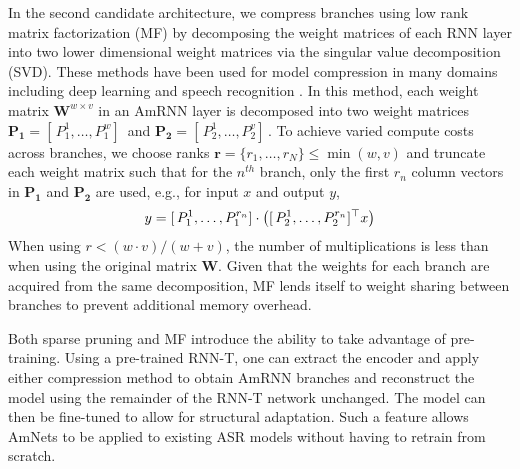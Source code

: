\documentclass[a4paper]{article}
\newcommand{\matdimx}{w}
\newcommand{\matdimy}{v}
\begin{document}
In the second candidate architecture, we compress branches using low rank matrix factorization (MF) by decomposing the weight matrices of each RNN layer into two lower dimensional weight matrices via the singular value decomposition (SVD). These methods have been used for model compression in many domains \cite{Andrews1976,Aharon2006,Rufai2014,McGivney2014} including deep learning and speech recognition \cite{Prabhavalkar2016,Kim2019,Swaminathan2020}. In this method, each weight matrix $\boldsymbol{W}^{ \matdimx \times \matdimy}$ in an AmRNN layer is decomposed into two weight matrices $\boldsymbol{P_{1}}=[ \,P_1^1,\ldots,P_1^\matdimx] \,$ and $\boldsymbol{P_2}=[ \,P_2^1,\ldots,P_2^\matdimy] \,$. To achieve varied compute costs across branches, we choose ranks $\textbf{r}=\{r_1,\ldots,r_N\} \leq \min(\matdimx,\matdimy)$ and truncate each weight matrix such that for the $n^{th}$ branch, only the first $r_n$ column vectors in $\boldsymbol{P_{1}}$ and $\boldsymbol{P_{2}}$ are used, e.g., for input $x$ and output $y$,
\noindent
\begin{align}\label{eqn:mat_fac}
	\noindent
	y= [ \,P_1^1,\ldots,P_1^{r_n}] \cdot \left ([ \,P_2^1,\ldots,P_2^{r_n}]^\top x \right )
\end{align}
\noindent
When using $r < (\matdimx \cdot \matdimy)/(\matdimx+\matdimy)$, the number of multiplications is less than when using the original matrix $\boldsymbol{W}$.
Given that the weights for each branch are acquired from the same decomposition, MF lends itself to weight sharing between branches to prevent additional memory overhead.

Both sparse pruning and MF introduce the ability to take advantage of pre-training.
Using a pre-trained RNN-T, one can extract the encoder and apply either compression method to obtain AmRNN branches and reconstruct the model using the remainder of the RNN-T network unchanged.
The model can then be fine-tuned to allow for structural adaptation.
Such a feature allows AmNets to be applied to existing ASR models without having to retrain from scratch.
\end{document}
